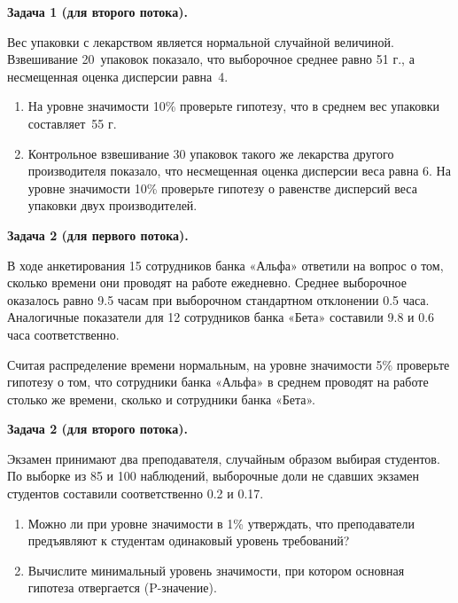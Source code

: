 \documentclass[12pt, a4paper]{article}\usepackage[]{graphicx}\usepackage[]{color}
\begin{document}
\vspace{0.5cm}

\textbf{Задача 1 (для второго потока).}

Вес упаковки с лекарством является нормальной случайной величиной. Взвешивание 20~упаковок показало, что выборочное среднее равно 51 г., а  несмещенная оценка дисперсии равна~4.
\begin{enumerate}
\item На уровне значимости 10\% проверьте гипотезу, что в среднем вес упаковки составляет~55 г.
\item Контрольное взвешивание 30 упаковок такого же лекарства другого производителя показало, что несмещенная оценка дисперсии веса равна 6. На уровне значимости 10\% проверьте гипотезу о равенстве дисперсий веса упаковки двух производителей.
\end{enumerate}

\vspace{0.5cm}

\textbf{Задача 2 (для первого потока).}

В ходе анкетирования  15 сотрудников банка «Альфа» ответили на вопрос о том, сколько времени они проводят на работе ежедневно. Среднее выборочное оказалось равно 9.5 часам при выборочном стандартном отклонении 0.5 часа. Аналогичные показатели для 12 сотрудников банка «Бета» составили 9.8 и 0.6 часа соответственно.

Считая распределение времени нормальным, на уровне значимости 5\% проверьте гипотезу о том, что сотрудники банка «Альфа» в среднем проводят на работе столько же времени, сколько и сотрудники банка «Бета».

\vspace{0.5cm}

\textbf{Задача 2 (для второго потока).}

Экзамен принимают два преподавателя, случайным образом выбирая студентов. По выборке из 85 и 100 наблюдений, выборочные доли не сдавших экзамен студентов составили соответственно 0.2  и 0.17.
\begin{enumerate}
\item Можно ли при уровне значимости в 1\% утверждать, что преподаватели предъявляют к студентам одинаковый уровень требований?
\item Вычислите минимальный уровень значимости, при котором основная гипотеза отвергается (P-значение).
\end{enumerate}

\vspace{0.5cm}
\end{document}

